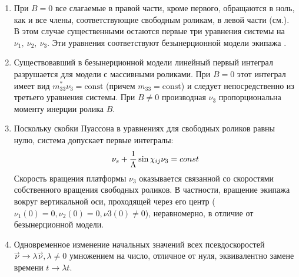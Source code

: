 \begin{enumerate}
    \item При $B = 0$ все слагаемые в правой части, кроме первого, обращаются в ноль, как и все члены, соответствующие свободным роликам, в левой части (см.). В этом случае существенными остаются первые три уравнения системы на $\nu_1,\ \nu_2,\ \nu_3$. Эти уравнения соответствуют безынерционной модели экипажа \cite{ZobovaTatarinovPMM}.
    \item Существовавший в безынерционной модели линейный первый интеграл разрушается для модели с массивными роликами. При $B = 0$ этот интеграл имеет вид $m_{33}^*\nu_3 = \mathrm{const}$ (причем $m_{33} = \mathrm{const}$) и следует непосредственно из третьего уравнения системы. При $B\neq 0$ производная $\nu_3$ пропорциональна моменту инерции ролика $B$.
    \item Поскольку скобки Пуассона в уравнениях для свободных роликов равны нулю, система допускает первые интегралы:
    \begin{equation}
        \label{int_free_roller}
    \nu_s + \displaystyle\frac{\displaystyle 1}{\displaystyle \Lambda}\sin\chi_{ij}\nu_3 = const
    \end{equation}
    Скорость вращения платформы $\nu_3$ оказывается связанной со скоростями собственного вращения свободных роликов. В частности, вращение экипажа вокруг вертикальной оси, проходящей через его центр ($\nu_1(0) = 0, \nu_2(0) = 0, \nu3(0) \neq 0$), неравномерно, в отличие от безынерционной модели.
    \item Одновременное изменение начальных значений всех псевдоскоростей $\vec{\nu} \rightarrow \lambda\vec{\nu}, \lambda \neq 0$ умножением на число, отличное от нуля, эквивалентно замене времени $t \rightarrow \lambda t$.
\end{enumerate}

